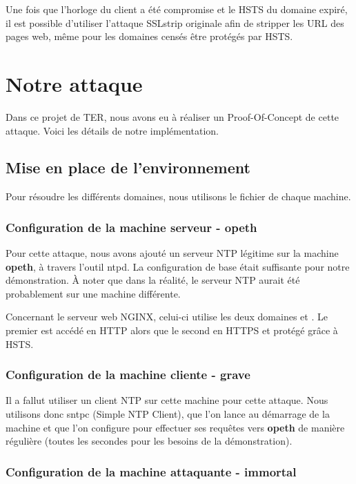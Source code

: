 Une fois que l'horloge du client a été compromise et le HSTS du domaine expiré, il est possible d'utiliser l'attaque SSLstrip originale afin de stripper les URL des pages web, même pour les domaines censés être protégés par HSTS.

\section{Notre attaque}

Dans ce projet de TER, nous avons eu à réaliser un Proof-Of-Concept de cette attaque. Voici les détails de notre implémentation.

\subsection{Mise en place de l'environnement}

Pour résoudre les différents domaines, nous utilisons le fichier  de chaque machine.

\subsubsection{Configuration de la machine serveur - opeth}

Pour cette attaque, nous avons ajouté un serveur NTP légitime sur la machine \textbf{opeth}, à travers l'outil ntpd. La configuration de base était suffisante pour notre démonstration. À noter que dans la réalité, le serveur NTP aurait été probablement sur une machine différente.

Concernant le serveur web NGINX, celui-ci utilise les deux domaines  et . Le premier est accédé en HTTP alors que le second en HTTPS et protégé grâce à HSTS.

\subsubsection{Configuration de la machine cliente - grave}

Il a fallut utiliser un client NTP sur cette machine pour cette attaque. Nous utilisons donc sntpc (Simple NTP Client), que l'on lance au démarrage de la machine et que l'on configure pour effectuer ses requêtes vers \textbf{opeth} de manière régulière (toutes les secondes pour les besoins de la démonstration).


\subsubsection{Configuration de la machine attaquante - immortal}

